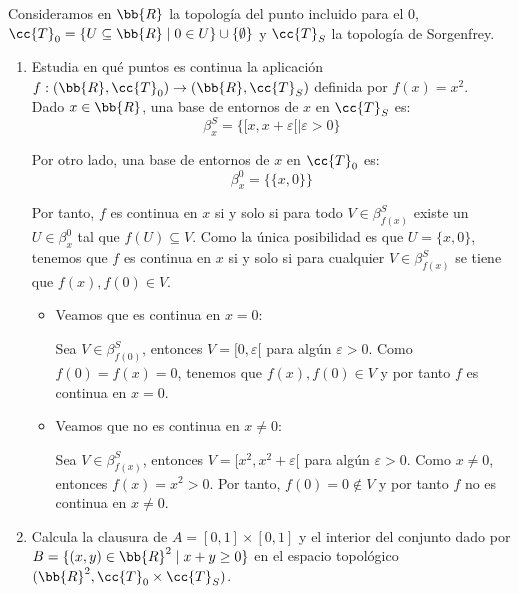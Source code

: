 \documentclass[12pt]{article}
\newcommand{\T}[0]{\cc{T}}
\begin{document}
    \begin{ejercicio}[4 puntos] Consideramos en $\bb{R}$ la topología del punto incluido para el $0$, $\T_0=\{U\subseteq\bb{R}\mid 0\in U\}\cup \{\emptyset\}$ y
        $\T_S$ la topología de Sorgenfrey.
        \begin{enumerate}
            \item Estudia en qué puntos es continua la aplicación $f:(\bb{R},\T_0)\to(\bb{R},\T_S)$ definida por $f(x)=x^2$.\\
            
            Dado $x\in \bb{R}$, una base de entornos de $x$ en $\T_S$ es:
            \begin{equation*}
                \beta_x^S = \{[x,x+\varepsilon[\mid \varepsilon>0\}
            \end{equation*}

            Por otro lado, una base de entornos de $x$ en $\T_0$ es:
            \begin{equation*}
                \beta_x^0 = \{\{x,0\}\}
            \end{equation*}

            Por tanto, $f$ es continua en $x$ si y solo si para todo $V\in \beta_{f(x)}^S$ existe un $U\in \beta_x^0$ tal que $f(U)\subseteq V$.
            Como la única posibilidad es que $U=\{x,0\}$,
            tenemos que $f$ es continua en $x$ si y solo si para cualquier $V\in \beta_{f(x)}^S$ se tiene que $f(x), f(0)\in V$.

            \begin{itemize}
                \item Veamos que es continua en $x=0$:
                
                Sea $V\in \beta_{f(0)}^S$, entonces $V=[0,\varepsilon[$ para algún $\varepsilon>0$.
                Como $f(0)=f(x)=0$, tenemos que $f(x),f(0)\in V$ y por tanto $f$ es continua en $x=0$.
                
                \item Veamos que no es continua en $x\neq 0$:
                
                Sea $V\in \beta_{f(x)}^S$, entonces $V=[x^2,x^2+\varepsilon[$ para algún $\varepsilon>0$.
                Como $x\neq 0$, entonces $f(x)=x^2> 0$. Por tanto, $f(0)=0\notin V$ y por tanto $f$ no es continua en $x\neq 0$.
            \end{itemize}
            

            \item Calcula la clausura de $A=[0,1]\times [0,1]$ y el interior del conjunto dado por $B=\{(x,y)\in\bb{R}^2\mid x+y\geq 0\}$ en 
            el espacio topológico $(\bb{R}^2,\T_0\times \T_S)$.\\


\end{enumerate}
\end{ejercicio}
\end{document}
